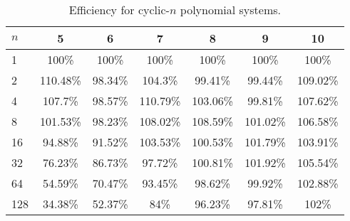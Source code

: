 \begin{table}[h]
\centering
\begin{tabular}{l||c|c|c|c|c|c|}
$n$ & 5 & 6 & 7 & 8 & 9 & 10\\ \hline
1 & 100\% & 100\% & 100\% & 100\% & 100\% & 100\%\\
2 & 110.48\% & 98.34\% & 104.3\% & 99.41\% & 99.44\% & 109.02\%\\
4 & 107.7\% & 98.57\% & 110.79\% & 103.06\% & 99.81\% & 107.62\%\\
8 & 101.53\% & 98.23\% & 108.02\% & 108.59\% & 101.02\% & 106.58\%\\
16 & 94.88\% & 91.52\% & 103.53\% & 100.53\% & 101.79\% & 103.91\%\\
32 & 76.23\% & 86.73\% & 97.72\% & 100.81\% & 101.92\% & 105.54\%\\
64 & 54.59\% & 70.47\% & 93.45\% & 98.62\% & 99.92\% & 102.88\%\\
128 & 34.38\% & 52.37\% & 84\% & 96.23\% & 97.81\% & 102\%\\
\end{tabular}
\caption{Efficiency for cyclic-$n$ polynomial systems.}
\label{CyclicParallelEfficiency}
\end{table}